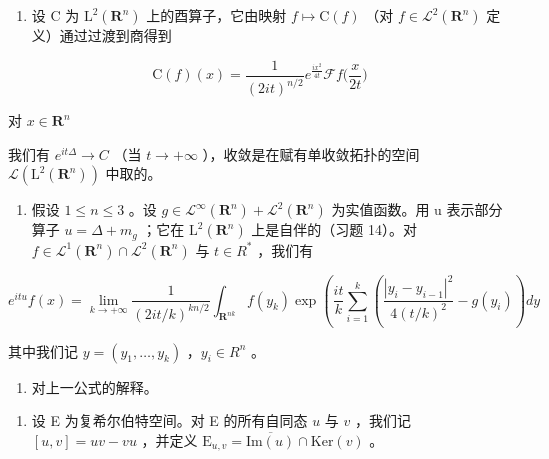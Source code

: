 \begin{enumerate}
\def\labelenumi{\alph{enumi})}
\setcounter{enumi}{1}
\tightlist
\item
  设 C 为 \(\mathrm{L}^{2}(\mathbf{R}^{n})\) 上的酉算子，它由映射 \(f \mapsto \mathrm{C}(f)\) （对 \(f \in \mathcal{L}^{2}(\mathbf{R}^{n})\) 定义）通过过渡到商得到
\end{enumerate}

\[
\mathrm{C} (f) (x) = \frac {1}{(2 i t) ^ {n / 2}} e ^ {\frac {i x ^ {2}}{4 t}} \mathcal {F} f \Big (\frac {x}{2 t} \Big)
\]

对 \(x\in \mathbf{R}^n\)

我们有 \(e^{it\Delta} \to C\) （当 \(t \to +\infty\) ），收敛是在赋有单收敛拓扑的空间 \(\mathcal{L}(\mathrm{L}^{2}(\mathbf{R}^{n}))\) 中取的。

\begin{enumerate}
\def\labelenumi{\alph{enumi})}
\setcounter{enumi}{2}
\tightlist
\item
  假设 \(1 \leqslant n \leqslant 3\) 。设 \(g \in \mathcal{L}^{\infty}(\mathbf{R}^{n}) + \mathcal{L}^{2}(\mathbf{R}^{n})\) 为实值函数。用 u 表示部分算子 \(u = \Delta + m_{g}\) ；它在 \(\mathrm{L}^{2}(\mathbf{R}^{n})\) 上是自伴的（习题 14）。对 \(f \in \mathcal{L}^{1}(\mathbf{R}^{n}) \cap \mathcal{L}^{2}(\mathbf{R}^{n})\) 与 \(t \in R^{*}\) ，我们有
\end{enumerate}

\[
e ^ {i t u} f (x) = \lim _ {k \rightarrow + \infty} \frac {1}{(2 i t / k) ^ {k n / 2}} \int_ {\mathbf {R} ^ {n k}} f (y _ {k}) \exp \left(\frac {i t}{k} \sum_ {i = 1} ^ {k} \left(\frac {| y _ {i} - y _ {i - 1} | ^ {2}}{4 (t / k) ^ {2}} - g (y _ {i})\right) d y \right.
\]

其中我们记 \(y = (y_{1}, \ldots, y_{k})\) ，\(y_{i} \in R^{n}\) 。

\begin{enumerate}
\def\labelenumi{\alph{enumi})}
\setcounter{enumi}{3}
\tightlist
\item
  对上一公式的解释。
\end{enumerate}

\begin{enumerate}
\def\labelenumi{\arabic{enumi})}
\setcounter{enumi}{33}
\tightlist
\item
  设 E 为复希尔伯特空间。对 E 的所有自同态 \(u\) 与 \(v\) ，我们记 \([u,v] = uv - vu\) ，并定义 \(\mathrm{E}_{u,v} = \overline{\mathrm{Im}(u)} \cap \mathrm{Ker}(v)\) 。
\end{enumerate}

